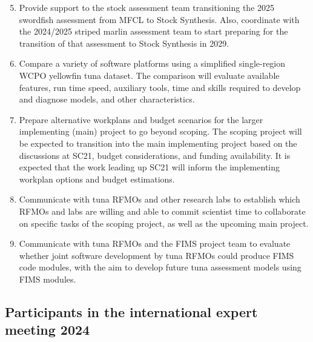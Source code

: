 \documentclass{SCreport}
\begin{document}
\begin{enumerate}\setcounter{enumi}{4}
  \item Provide support to the stock assessment team transitioning the 2025
  swordfish assessment from MFCL to Stock Synthesis. Also, coordinate with the
  2024/2025 striped marlin assessment team to start preparing for the transition
  of that assessment to Stock Synthesis in 2029.
  \item Compare a variety of software platforms using a simplified single-region
  WCPO yellowfin tuna dataset. The comparison will evaluate available features,
  run time speed, auxiliary tools, time and skills required to develop and
  diagnose models, and other characteristics.
  \item Prepare alternative workplans and budget scenarios for the larger
  implementing (main) project to go beyond scoping. The scoping project will be
  expected to transition into the main implementing project based on the
  discussions at SC21, budget considerations, and funding availability. It is
  expected that the work leading up SC21 will inform the implementing workplan
  options and budget estimations.
  \newpage
  \item Communicate with tuna RFMOs and other research labs to establish which
  RFMOs and labs are willing and able to commit scientist time to collaborate on
  specific tasks of the scoping project, as well as the upcoming main project.
  \item Communicate with tuna RFMOs and the FIMS project team to evaluate
  whether joint software development by tuna RFMOs could produce FIMS code
  modules, with the aim to develop future tuna assessment models using FIMS
  modules.
\end{enumerate}

\subsection{Participants in the international expert meeting 2024}
\label{sec:meeting-participants}

\vspace{2ex}
\end{document}
